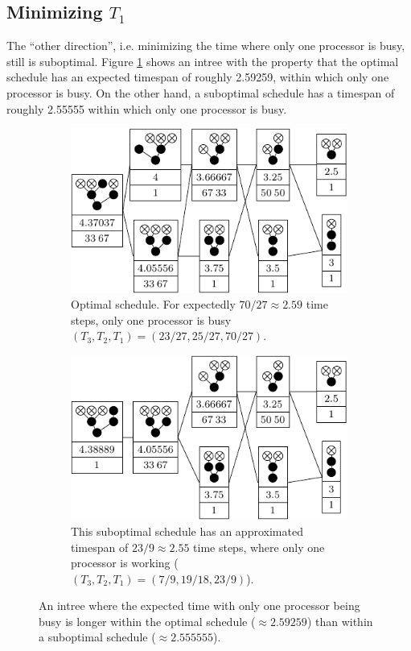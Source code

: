 \subsection{Minimizing $T_1$}
\label{sec:p3-disproving-short-p1}

The ``other direction'', i.e. minimizing the time where only one processor is busy, still is suboptimal.
Figure \ref{fig:p3-p1s-suboptimal-example} shows an intree with the property that the optimal schedule has an expected timespan of roughly 2.59259, within which only one processor is busy. On the other hand, a suboptimal schedule has a timespan of roughly 2.55555 within which only one processor is busy.

\begin{figure}[ht]
  \centering
  \begin{subfigure}{.45\linewidth}
    \centering
    \includegraphics{p3/keep_1_unbusy/one_unbusy_opt.pdf}
    \caption{Optimal schedule. For expectedly $70/27\approx 2.59$ time steps, only one processor is busy $(T_3, T_2, T_1)=(23/27, 25/27, 70/27)$.}
  \end{subfigure}
  \quad
  \begin{subfigure}{.45\linewidth}
    \centering
    \includegraphics{p3/keep_1_unbusy/one_unbusy_subopt.pdf}
    \caption{This suboptimal schedule has an approximated timespan of $23/9\approx 2.55$ time steps, where only one processor is working ($(T_3, T_2, T_1)=(7/9,19/18,23/9)$).}
  \end{subfigure}
  \caption{An intree where the expected time with only one processor being busy is longer within the optimal schedule ($\approx 2.59259$) than within a suboptimal schedule ($\approx 2.555555$).}
  \label{fig:p3-p1s-suboptimal-example}
\end{figure}

